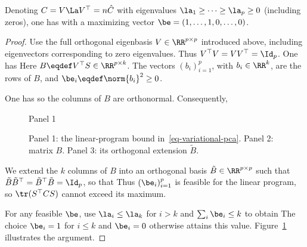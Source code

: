 \begin{lem}\label{lem-upper-bound-pca}
	Denoting $C=V\La V^\top=n\hat C$ with eigenvalues $\la_1\geq\cdots\geq\la_p\geq0$ (including zeros), one has
	with a maximizing vector $\be=(1,\ldots,1,0,\ldots,0)$.
\end{lem}
\begin{proof}
	Use the full orthogonal eigenbasis $V\in\RR^{p\times p}$ introduced above, including eigenvectors corresponding to zero eigenvalues. Thus $V^\top V=VV^\top=\Id_p$. One has
	Here $B\eqdef V^\top S \in \RR^{p \times k}$. The vectors $(b_i)_{i=1}^p$, with $b_i \in \RR^k$, are the rows of $B$, and $\be_i \eqdef \norm{b_i}^2 \geq 0$.
	 
	One has
	so the columns of $B$ are orthonormal. Consequently,
	
	\begin{figure}[tbp]
\centering
{\small\sffamily\color{BookMuted}Panel 1\par}\smallskip
{}\par\medskip
{}\hfill
{}
\caption{Panel 1: the linear-program bound in~\eqref{eq-variational-pca}. Panel 2: matrix $B$. Panel 3: its orthogonal extension $\tilde B$.}
\label{fig-pca-var-proof}
\end{figure}


	We extend the $k$ columns of $B$ into an orthogonal basis $\tilde B \in \RR^{p \times p}$ such that $\tilde B \tilde B^\top = \tilde B^\top\tilde B=\Id_p$, so that
	Thus $(\be_i)_{i=1}^p$ is feasible for the linear program, so $\tr(S^\top C S)$
	cannot exceed its maximum.
	 
	
	For any feasible $\be$, use $\la_i\leq\la_k$ for $i>k$ and $\sum_i\be_i\leq k$ to obtain
The choice $\be_i=1$ for $i\leq k$ and $\be_i=0$ otherwise attains this value. Figure~\ref{fig-pca-var-proof} illustrates the argument.
\end{proof}


